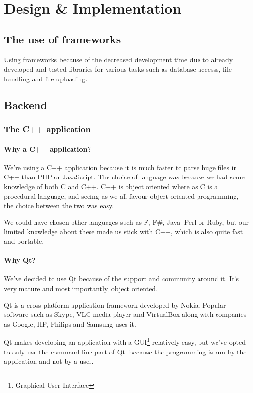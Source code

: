 \chapter{Design \& Implementation}
\section{The use of frameworks}
Using frameworks because of the decreased development time due to already developed and tested libraries for various tasks such as database accesss, file handling and file uploading.

\section{Backend}
\subsection{The C++ application}
\subsubsection{Why a C++ application?}
We're using a C++ application because it is much faster to parse huge files in C++ than PHP or JavaScript.
The choice of language was because we had some knowledge of both C and C++. C++ is object oriented where as C is a procedural language, and seeing as we all favour object oriented programming, the choice between the two was easy.

We could have chosen other languages such as F, F\#, Java, Perl or Ruby, but our limited knowledge about these made us stick with C++, which is also quite fast and portable.

\subsubsection{Why Qt?}
We've decided to use Qt because of the support and community around it. It's very mature and most importantly, object oriented.

Qt is a cross-platform application framework developed by Nokia. Popular software such as Skype, VLC media player and VirtualBox along with companies as Google, HP, Philips and Samsung uses it.

Qt makes developing an application with a GUI\footnote{Graphical User Interface} relatively easy, but we've opted to only use the command line part of Qt, because the programming is run by the application and not by a user.

